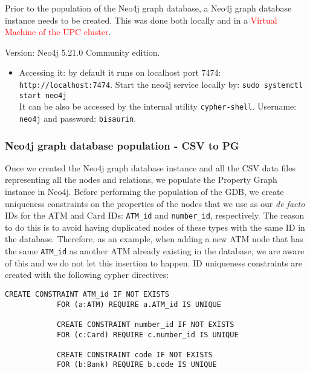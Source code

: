 Prior to the population of the Neo4j graph database, a Neo4j graph database instance needs to be
created. This was done both locally and in a \textcolor{red}{Virtual Machine of the UPC cluster}.

Version: Neo4j 5.21.0 Community edition. 
\begin{itemize}
    \item Accessing it: by default it runs on localhost port 7474: \texttt{http://localhost:7474}.
    Start the neo4j service locally by: \texttt{sudo systemctl start neo4j}\\
    It can be also be accessed by the internal utility \texttt{cypher-shell}. Username: \texttt{neo4j} and password: \texttt{bisaurin}.
\end{itemize}

\subsubsection*{Neo4j graph database population - CSV to PG}
\begin{comment}
    - Creación de la GDB - de CSV a Neo4j PG: 
    - Poner primero los comandos cypher por separado, con las constraints de uniqueness
    y luego lo de poblar. Luego ya referir a que todo ello se tiene en un único script que 
    permite la ejecución directa (en lugar de paso a paso) en golang.
    - Incluir detalles específicos de cada CSV...
\end{comment}

Once we created the Neo4j graph database instance and all the CSV data files representing all the nodes and relations, we populate the Property Graph instance in Neo4j. Before performing the population of the GDB, we create uniqueness constraints on the properties of the nodes that we use as our \emph{de facto} IDs for the ATM and Card IDs: \texttt{ATM\_id} and \texttt{number\_id}, respectively. The reason to do this is to avoid having duplicated nodes of these types with the same ID in the database. Therefore, as an example, when adding a new ATM node that has the same \texttt{ATM\_id} as another ATM already existing in the database, we are aware of this and we do not let this insertion to happen. ID uniqueness constraints are created with the following cypher directives:

\begin{center}
\lstset{style=cypherStyle}
\begin{lstlisting}[caption={Uniqueness ID constraints}]
            CREATE CONSTRAINT ATM_id IF NOT EXISTS
            FOR (a:ATM) REQUIRE a.ATM_id IS UNIQUE
    
            CREATE CONSTRAINT number_id IF NOT EXISTS
            FOR (c:Card) REQUIRE c.number_id IS UNIQUE
    
            CREATE CONSTRAINT code IF NOT EXISTS
            FOR (b:Bank) REQUIRE b.code IS UNIQUE
\end{lstlisting}
\end{center}

